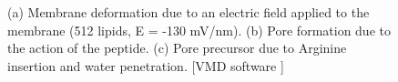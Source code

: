 \begin{figure}[t]
\centering
\begin{minipage}[b]{0.26\linewidth}
\centering
{}
\end{minipage}
\begin{minipage}[b]{0.4\linewidth}
\centering
{}
\end{minipage}
\begin{minipage}[b]{0.26\linewidth}
\centering
{}
\end{minipage}
\caption[Snapshot from relevant membrane-peptide simulations]{(a) Membrane deformation due to an electric field applied to the membrane (512 lipids, E = -130 mV/nm). (b) Pore formation due to the action of the peptide. (c) Pore precursor due to Arginine insertion and water penetration. [VMD software \citet{HUMP96}]}
\label{fig:pore_pics}
\end{figure}

